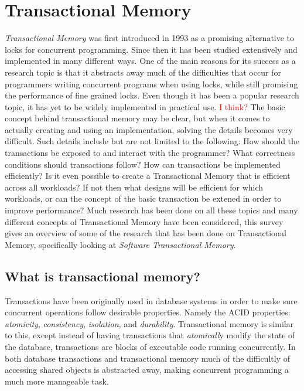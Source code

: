 \section{Transactional Memory}
\emph{Transactional Memory} was first introduced in 1993 \cite{165164} as a promising alternative to locks for concurrent programming.
Since then it has been studied extensively and implemented in many different ways.
One of the main reasons for its success as a research topic is that it abstracts away much of the difficulties that occur for programmers writing concurrent programs when using locks, while still promising the performance of fine grained locks.
Even though it has been a popular research topic, it has yet to be widely implemented in practical use.
\textcolor{Red}{I think?}
The basic concept behind transactional memory may be clear, but when it comes to actually creating and using an implementation, solving the details becomes very difficult.
Such details include but are not limited to the following:
How should the transactions be exposed to and interact with the programmer?
What correctness conditions should transactions follow?
How can transactions be implemented efficiently?  Is it even possible to create a Transactional Memory that is efficient across all workloads?
If not then what designs will be efficient for which workloads, or can the concept of the basic transaction be extened in order to improve performance?
Much research has been done on all these topics and many different concepts of Transactional Memory have been considered, this survey gives an overview of some of the research that has been done on Transactional Memory, specifically looking at \emph{Software Transactional Memory}.

\subsection{What is transactional memory?}
Transactions have been originally used in database systems in order to make sure concurrent operations follow desirable properties.  Namely the ACID properties: \emph{atomicity}, \emph{consistency}, \emph{isolation}, and \emph{durability}.  Transactional memory is similar to this, except instead of having transactions that \emph{atomicall}y modify the state of the database, transactions are blocks of executable code running concurrently.
In both database transactions and transactional memory much of the difficultly of accessing shared objects is abstracted away, making concurrent programming a much more manageable task.


